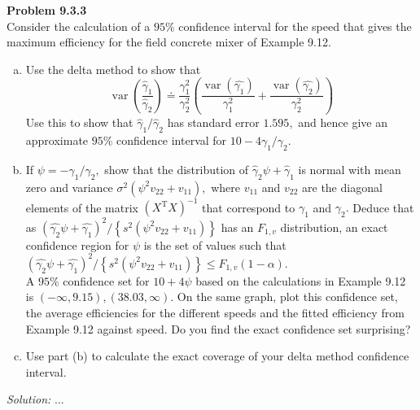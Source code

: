 \documentclass[a4paper, 11pt]{article}
\newenvironment{problem}[2][Problem]
    { \begin{mdframed}[backgroundcolor=gray!20] \textbf{#1 #2} \\}
    {  \end{mdframed}}
\newenvironment{solution}
    {\textit{Solution:}}
    {}
\begin{document}
\begin{problem}{9.3.3}
  Consider the calculation of a $95 \%$ confidence interval for the speed that gives the maximum efficiency for the field concrete mixer of Example 9.12.
  \begin{enumerate}[(a)]
    \item  Use the delta method to show that
    $$
    \operatorname{var}\left(\frac{\hat{\gamma}_{1}}{\hat{\gamma}_{2}}\right) \doteq \frac{\gamma_{1}^{2}}{\gamma_{2}^{2}}\left(\frac{\operatorname{var}(\hat{\gamma_{1}})}{\gamma_{1}^{2}}+\frac{\operatorname{var}(\hat{\gamma_{2}})}{\gamma_{2}^{2}}\right)
    $$
    Use this to show that $\hat{\gamma}_{1} / \hat{\gamma}_{2}$ has standard error $1.595,$ and hence give an approximate $95 \%$ confidence interval for $10-4 \gamma_{1} / \gamma_{2}$.

    \item If $\psi=-\gamma_{1} / \gamma_{2},$ show that the distribution of $\hat{\gamma}_{2} \psi+\hat{\gamma}_{1}$ is normal with mean zero and variance $\sigma^{2}\left(\psi^{2} v_{22}+v_{11}\right),$ where $v_{11}$ and $v_{22}$ are the diagonal elements of the matrix $\left(X^{\mathrm{T}} X\right)^{-1}$
    that correspond to $\gamma_{1}$ and $\gamma_{2} .$ Deduce that as $(\hat{\gamma_{2}} \psi+\hat{\gamma_{1}})^{2} /\left\{s^{2}\left(\psi^{2} v_{22}+v_{11}\right)\right\}$
    has an $F_{1, v}$ distribution, an exact confidence region for $\psi$ is the set of values such that $(\hat{\gamma_{2}} \psi+\hat{\gamma_{1}})^{2} /\left\{s^{2}\left(\psi^{2} v_{22}+v_{11}\right)\right\} \leq F_{1, v}(1-\alpha)$.\\
    A $95 \%$ confidence set for $10+4 \psi$ based on the calculations in Example 9.12 is $(-\infty, 9.15),(38.03, \infty) .$ On the same graph, plot this confidence set, the average efficiencies for the different speeds and the fitted efficiency from Example 9.12 against speed. Do you find the exact confidence set surprising?

    \item Use part (b) to calculate the exact coverage of your delta method confidence interval.
  \end{enumerate}

\end{problem}
\begin{solution}
...
\end{solution}
\end{document}
